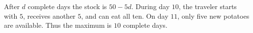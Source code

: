 After $d$ complete days the stock is $50-5d$. During day $10$, the traveler starts with $5$, receives another $5$, and can eat all ten. On day $11$, only five new potatoes are available. Thus the maximum is $\boxed{10}$ complete days.
